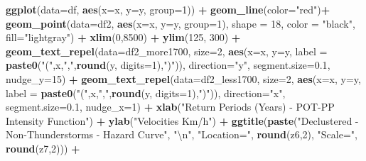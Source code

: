 \documentclass[12pt,oneside]{reedthesis}
\newenvironment{Shaded}{\begin{snugshade}}{\end{snugshade}}
\newcommand{\CharTok}[1]{\textcolor[rgb]{0.31,0.60,0.02}{#1}}
\newcommand{\DataTypeTok}[1]{\textcolor[rgb]{0.13,0.29,0.53}{#1}}
\newcommand{\DecValTok}[1]{\textcolor[rgb]{0.00,0.00,0.81}{#1}}
\newcommand{\FloatTok}[1]{\textcolor[rgb]{0.00,0.00,0.81}{#1}}
\newcommand{\KeywordTok}[1]{\textcolor[rgb]{0.13,0.29,0.53}{\textbf{#1}}}
\newcommand{\NormalTok}[1]{#1}
\newcommand{\OperatorTok}[1]{\textcolor[rgb]{0.81,0.36,0.00}{\textbf{#1}}}
\newcommand{\StringTok}[1]{\textcolor[rgb]{0.31,0.60,0.02}{#1}}
\begin{document}
\begin{Shaded}
\begin{Highlighting}[]
{{\KeywordTok{ggplot}\NormalTok{(}\DataTypeTok{data=}\NormalTok{df, }\KeywordTok{aes}\NormalTok{(}\DataTypeTok{x=}\NormalTok{x, }\DataTypeTok{y=}\NormalTok{y, }\DataTypeTok{group=}\DecValTok{1}\NormalTok{)) }\OperatorTok{+}
\StringTok{  }\KeywordTok{geom_line}\NormalTok{(}\DataTypeTok{color=}\StringTok{"red"}\NormalTok{)}\OperatorTok{+}
\StringTok{  }\KeywordTok{geom_point}\NormalTok{(}\DataTypeTok{data=}\NormalTok{df2, }\KeywordTok{aes}\NormalTok{(}\DataTypeTok{x=}\NormalTok{x, }\DataTypeTok{y=}\NormalTok{y, }\DataTypeTok{group=}\DecValTok{1}\NormalTok{), }\DataTypeTok{shape =} \DecValTok{18}\NormalTok{, }\DataTypeTok{color =} \StringTok{"black"}\NormalTok{, }\DataTypeTok{fill=}\StringTok{"lightgray"}\NormalTok{) }\OperatorTok{+}
\StringTok{  }\KeywordTok{xlim}\NormalTok{(}\DecValTok{0}\NormalTok{,}\DecValTok{8500}\NormalTok{) }\OperatorTok{+}\StringTok{ }
\StringTok{  }\KeywordTok{ylim}\NormalTok{(}\DecValTok{125}\NormalTok{, }\DecValTok{300}\NormalTok{) }\OperatorTok{+}
\StringTok{  }\KeywordTok{geom_text_repel}\NormalTok{(}\DataTypeTok{data=}\NormalTok{df2_more1700, }\DataTypeTok{size=}\DecValTok{2}\NormalTok{, }\KeywordTok{aes}\NormalTok{(}\DataTypeTok{x=}\NormalTok{x, }\DataTypeTok{y=}\NormalTok{y, }\DataTypeTok{label =} \KeywordTok{paste0}\NormalTok{(}\StringTok{"("}\NormalTok{,x,}\StringTok{","}\NormalTok{,}\KeywordTok{round}\NormalTok{(y, }\DataTypeTok{digits=}\DecValTok{1}\NormalTok{),}\StringTok{")"}\NormalTok{)),  }\DataTypeTok{direction=}\StringTok{"y"}\NormalTok{, }\DataTypeTok{segment.size=}\FloatTok{0.1}\NormalTok{, }
   \DataTypeTok{nudge_y=}\DecValTok{15}\NormalTok{) }\OperatorTok{+}\StringTok{ }
\StringTok{  }\KeywordTok{geom_text_repel}\NormalTok{(}\DataTypeTok{data=}\NormalTok{df2_less1700, }\DataTypeTok{size=}\DecValTok{2}\NormalTok{, }\KeywordTok{aes}\NormalTok{(}\DataTypeTok{x=}\NormalTok{x, }\DataTypeTok{y=}\NormalTok{y, }\DataTypeTok{label =} \KeywordTok{paste0}\NormalTok{(}\StringTok{"("}\NormalTok{,x,}\StringTok{","}\NormalTok{,}\KeywordTok{round}\NormalTok{(y, }\DataTypeTok{digits=}\DecValTok{1}\NormalTok{),}\StringTok{")"}\NormalTok{)),  }\DataTypeTok{direction=}\StringTok{"x"}\NormalTok{, }\DataTypeTok{segment.size=}\FloatTok{0.1}\NormalTok{, }
   \DataTypeTok{nudge_x=}\DecValTok{1}\NormalTok{) }\OperatorTok{+}
\StringTok{  }\KeywordTok{xlab}\NormalTok{(}\StringTok{"Return Periods (Years) - POT-PP Intensity Function"}\NormalTok{) }\OperatorTok{+}\StringTok{ }
\StringTok{  }\KeywordTok{ylab}\NormalTok{(}\StringTok{"Velocities Km/h"}\NormalTok{) }\OperatorTok{+}\StringTok{ }
\StringTok{  }\KeywordTok{ggtitle}\NormalTok{(}\KeywordTok{paste}\NormalTok{(}\StringTok{"Declustered - Non-Thunderstorms - Hazard Curve"}\NormalTok{, }\StringTok{"}\CharTok{\textbackslash{}n}\StringTok{"}\NormalTok{, }\StringTok{"Location="}\NormalTok{, }\KeywordTok{round}\NormalTok{(z6,}\DecValTok{2}\NormalTok{),  }\StringTok{"Scale="}\NormalTok{, }\KeywordTok{round}\NormalTok{(z7,}\DecValTok{2}\NormalTok{))) }\OperatorTok{+}\StringTok{ }
}}
\end{Highlighting}
\end{Shaded}
\end{document}
